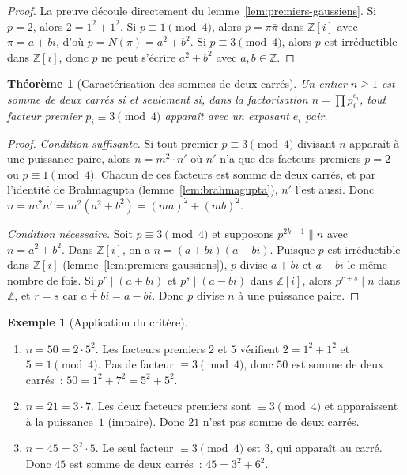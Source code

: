 \documentclass[12pt,a4paper,openany]{book}
\theoremstyle{definition}
\newtheorem{exemple}[definition]{Exemple}
\theoremstyle{plain}
\newtheorem{theoreme}[definition]{Théorème}
\theoremstyle{remark}
\newcommand{\Z}{\mathbb{Z}}
\begin{document}
\begin{proof}
La preuve découle directement du lemme~\ref{lem:premiers-gaussiens}. Si $p = 2$, alors
$2 = 1^2 + 1^2$. Si $p \equiv 1 \pmod{4}$, alors $p = \pi\bar\pi$ dans $\Z[i]$ avec
$\pi = a + bi$, d'où $p = N(\pi) = a^2 + b^2$. Si $p \equiv 3 \pmod{4}$, alors $p$
est irréductible dans $\Z[i]$, donc $p$ ne peut s'écrire $a^2 + b^2$ avec $a, b \in \Z$.
\end{proof}

\begin{theoreme}[Caractérisation des sommes de deux carrés]
\label{thm:caract-sommes-deux-carres}
Un entier $n \geq 1$ est somme de deux carrés si et seulement si, dans la factorisation
$n = \prod p_i^{e_i}$, tout facteur premier $p_i \equiv 3 \pmod{4}$ apparaît avec un
exposant $e_i$ pair.
\end{theoreme}

\begin{proof}
\emph{Condition suffisante.} Si tout premier $p \equiv 3 \pmod{4}$ divisant $n$ apparaît
à une puissance paire, alors $n = m^2 \cdot n'$ où $n'$ n'a que des facteurs premiers
$p = 2$ ou $p \equiv 1 \pmod{4}$. Chacun de ces facteurs est somme de deux carrés, et
par l'identité de Brahmagupta (lemme~\ref{lem:brahmagupta}), $n'$ l'est aussi. Donc
$n = m^2 n' = m^2(a^2 + b^2) = (ma)^2 + (mb)^2$.

\emph{Condition nécessaire.} Soit $p \equiv 3 \pmod{4}$ et supposons $p^{2k+1} \| n$ avec
$n = a^2 + b^2$. Dans $\Z[i]$, on a $n = (a+bi)(a-bi)$. Puisque $p$ est irréductible
dans $\Z[i]$ (lemme~\ref{lem:premiers-gaussiens}), $p$ divise $a+bi$ et $a-bi$ le même
nombre de fois. Si $p^r \mid (a+bi)$ et $p^s \mid (a-bi)$ dans $\Z[i]$, alors
$p^{r+s} \mid n$ dans $\Z$, et $r = s$ car $\overline{a+bi} = a-bi$. Donc $p$ divise
$n$ à une puissance paire.
\end{proof}

\begin{exemple}[Application du critère]
\label{ex:application-critere-deux-carres}
\begin{enumerate}[label=(\alph*)]
  \item $n = 50 = 2 \cdot 5^2$. Les facteurs premiers $2$ et $5$ vérifient
    $2 = 1^2 + 1^2$ et $5 \equiv 1 \pmod{4}$. Pas de facteur $\equiv 3 \pmod{4}$, donc
    $50$ est somme de deux carrés~: $50 = 1^2 + 7^2 = 5^2 + 5^2$.
  \item $n = 21 = 3 \cdot 7$. Les deux facteurs premiers sont $\equiv 3 \pmod{4}$ et
    apparaissent à la puissance~$1$ (impaire). Donc $21$ n'est pas somme de deux carrés.
  \item $n = 45 = 3^2 \cdot 5$. Le seul facteur $\equiv 3 \pmod{4}$ est $3$, qui
    apparaît au carré. Donc $45$ est somme de deux carrés~: $45 = 3^2 + 6^2$.
\end{enumerate}
\end{exemple}
\end{document}
